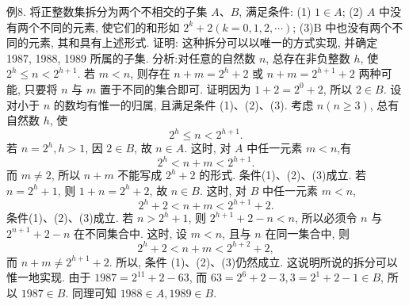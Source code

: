 例8. 将正整数集拆分为两个不相交的子集 $A 、 B$, 满足条件:
(1) $1 \in A$;
(2) $A$ 中没有两个不同的元素, 使它们的和形如 $2^k+2(k=0,1,2, \cdots)$;
(3)B 中也没有两个不同的元素, 其和具有上述形式.
证明: 这种拆分可以以唯一的方式实现, 并确定 1987, 1988, 1989 所属的子集.
分析:对任意的自然数 $n$, 总存在非负整数 $h$, 使 $2^h \leqslant n<2^{h+1}$. 若 $m<n$, 则存在 $n+m=2^h+2$ 或 $n+m=2^{h+1}+2$ 两种可能, 只要将 $n$ 与 $m$ 置于不同的集合即可.
证明因为 $1+2=2^0+2$, 所以 $2 \in B$. 设对小于 $n$ 的数均有惟一的归属, 且满足条件 (1)、(2)、(3). 考虑 $n(n \geqslant 3)$, 总有自然数 $h$, 使
$$
2^h \leqslant n<2^{h+1} .
$$
若 $n=2^h, h>1$, 因 $2 \in B$, 故 $n \in A$. 这时, 对 $A$ 中任一元素 $m<n$,有
$$
2^h<n+m<2^{h+1} .
$$
而 $m \neq 2$, 所以 $n+m$ 不能写成 $2^h+2$ 的形式.
条件(1)、(2)、(3)成立.
若 $n=2^h+1$, 则 $1+n=2^h+2$, 故 $n \in B$. 这时, 对 $B$ 中任一元素 $m<n$,
$$
2^h+2<n+m<2^{h+1}+2 .
$$
条件(1)、(2)、(3)成立.
若 $n>2^h+1$, 则 $2^{h+1}+2-n<n$, 所以必须令 $n$ 与 $2^{n+1}+2-n$ 在不同集合中.
这时, 设 $m<n$, 且与 $n$ 在同一集合中, 则
$$
2^h+2<n+m<2^{h+2}+2,
$$
而 $n+m \neq 2^{h+1}+2$. 所以, 条件 (1)、(2)、(3)仍然成立.
这说明所说的拆分可以惟一地实现.
由于 $1987=2^{11}+2-63$, 而 $63=2^6+2-3,3=2^1+2-1 \in B$, 所以 $1987 \in B$.
同理可知 $1988 \in A, 1989 \in B$.



